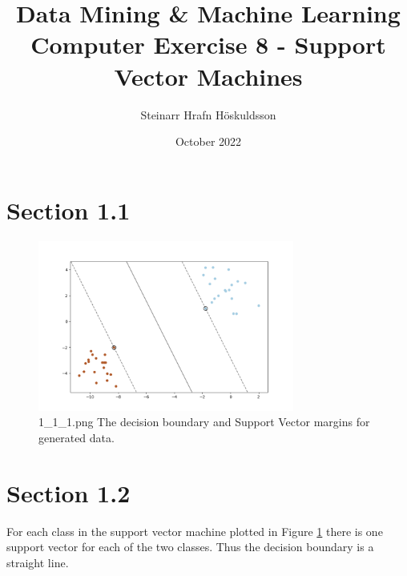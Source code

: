 \documentclass{article}
\title{Data Mining \& Machine Learning \\ \large Computer Exercise 8 - Support Vector Machines}
\author{Steinarr Hrafn Höskuldsson}
\date{October 2022}
\newcommand{\mycomment}[1]{}
\begin{document}
\maketitle
\mycomment{
\begin{figure}[h]
    \centering
    \texttt{[image: LAB3/Basic1.png]}
    \caption{"Switch test" Breadboard set up}
    \label{fig:Switch_test}
\end{figure}



}
\section*{Section 1.1}
\begin{figure}[H]
    \centering
    \includegraphics[width=0.75\textwidth]{08_SVM/1_1_1.png}
    \caption{1\_1\_1.png The decision boundary and Support Vector margins for generated data.}
    \label{fig:section11}
\end{figure}

\section*{Section 1.2}
For each class in the support vector machine plotted in Figure \ref{fig:section11} there is one support vector for each of the two classes. Thus the decision boundary is a straight line.
\end{document}
